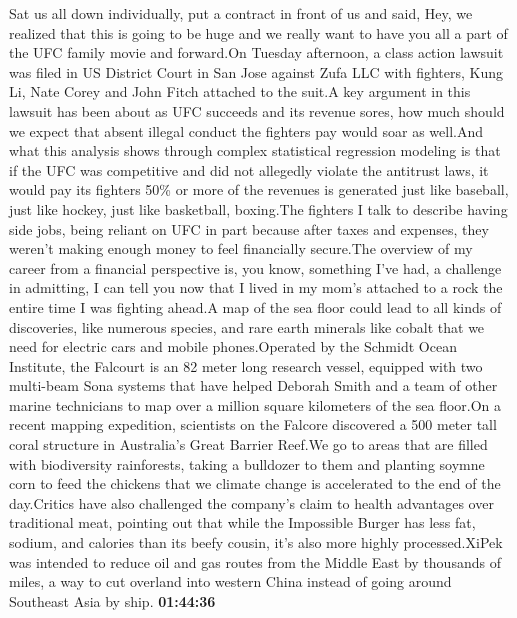 \documentclass{article}%
\begin{document}
Sat us all down individually, put a contract in front of us and said, Hey, we realized that this is going to be huge and we really want to have you all a part of the UFC family movie and forward.On Tuesday afternoon, a class action lawsuit was filed in US District Court in San Jose against Zufa LLC with fighters, Kung Li, Nate Corey and John Fitch attached to the suit.A key argument in this lawsuit has been about as UFC succeeds and its revenue sores, how much should we expect that absent illegal conduct the fighters pay would soar as well.And what this analysis shows through complex statistical regression modeling is that if the UFC was competitive and did not allegedly violate the antitrust laws, it would pay its fighters 50\% or more of the revenues is generated just like baseball, just like hockey, just like basketball, boxing.The fighters I talk to describe having side jobs, being reliant on UFC in part because after taxes and expenses, they weren't making enough money to feel financially secure.The overview of my career from a financial perspective is, you know, something I've had, a challenge in admitting, I can tell you now that I lived in my mom's attached to a rock the entire time I was fighting ahead.A map of the sea floor could lead to all kinds of discoveries, like numerous species, and rare earth minerals like cobalt that we need for electric cars and mobile phones.Operated by the Schmidt Ocean Institute, the Falcourt is an 82 meter long research vessel, equipped with two multi{-}beam Sona systems that have helped Deborah Smith and a team of other marine technicians to map over a million square kilometers of the sea floor.On a recent mapping expedition, scientists on the Falcore discovered a 500 meter tall coral structure in Australia's Great Barrier Reef.We go to areas that are filled with biodiversity rainforests, taking a bulldozer to them and planting soymne corn to feed the chickens that we climate change is accelerated to the end of the day.Critics have also challenged the company's claim to health advantages over traditional meat, pointing out that while the Impossible Burger has less fat, sodium, and calories than its beefy cousin, it's also more highly processed.XiPek was intended to reduce oil and gas routes from the Middle East by thousands of miles, a way to cut overland into western China instead of going around Southeast Asia by ship.%
\textbf{01:44:36}%
\end{document}
